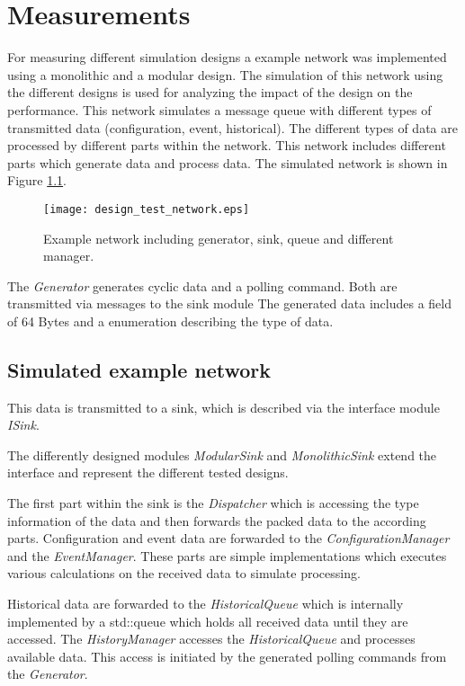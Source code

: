 \chapter{Measurements}
\label{cha:measurements}
For measuring different simulation designs a example network was implemented using a monolithic and a modular design.
The simulation of this network using the different designs is used for analyzing the impact of the design on the performance.
This network simulates a message queue with different types of transmitted data (configuration, event, historical).
The different types of data are processed by different parts within the network.
This network includes different parts which generate data and process data.
The simulated network is shown in Figure \ref{fig:design_test_network}.

\begin{figure}
    \centering
    \texttt{[image: design\_test\_network.eps]}
    \caption{Example network including generator, sink, queue and different manager.}
    \label{fig:design_test_network}
\end{figure}

The \emph{Generator} generates cyclic data and a polling command.
Both are transmitted via messages to the sink module
The generated data includes a field of 64 Bytes and a enumeration describing the type of data.

\section{Simulated example network}
\label{sec:measurements_network}
This data is transmitted to a sink, which is described via the interface module \emph{ISink}.

The differently designed modules \emph{ModularSink} and \emph{MonolithicSink} extend the interface and represent the different tested designs.

The first part within the sink is the \emph{Dispatcher} which is accessing the type information of the data and then forwards the packed data to the according parts.
Configuration and event data are forwarded to the \emph{ConfigurationManager} and the \emph{EventManager}.
These parts are simple implementations which executes various calculations on the received data to simulate processing.

Historical data are forwarded to the \emph{HistoricalQueue} which is internally implemented by a std::queue which holds all received data until they are accessed.
The \emph{HistoryManager} accesses the \emph{HistoricalQueue} and processes available data.
This access is initiated by the generated polling commands from the \emph{Generator}.
\\

